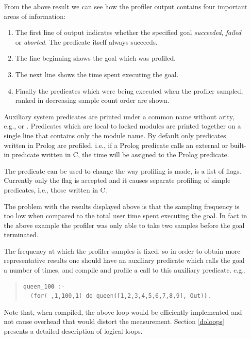 From the above result we can see how the profiler output contains four
important areas of information:
\begin{enumerate}
\item The first line of output indicates whether the specified goal
\emph{succeeded}, \emph{failed} or \emph{aborted}.  The
 predicate itself always succeeds.
\item The line beginning  shows the goal which was
profiled.
\item The next line shows the time spent executing the goal.
\item Finally the predicates which were being executed when the
profiler sampled, ranked in decreasing sample count order are shown.
\end{enumerate}

Auxiliary system predicates are printed under a
common name without arity, e.g.,  or
.
Predicates which are local to locked modules are printed
together on a single line that contains only the module name.
By default only predicates written in Prolog are profiled, i.e.,
if a Prolog predicate calls an external or built-in predicate
written in C, the time will be assigned to the Prolog predicate.

The predicate  can be used to change
the way profiling is made,  is a list of flags.
Currently only the flag  is accepted and it
causes separate profiling of simple predicates, i.e.,
those written in C.

The problem with the results displayed above is that the sampling
frequency is too low when compared to the total user time spent
executing the goal.  In fact in the above example the profiler was
only able to take two samples before the goal terminated.

The frequency at which the profiler samples is fixed, so in order to
obtain more representative results one should have an auxiliary
predicate which calls the goal a number of times, and compile and
profile a call to this auxiliary predicate. e.g.,

\begin{quote}
\begin{verbatim}
queen_100 :-
  (for(_,1,100,1) do queen([1,2,3,4,5,6,7,8,9],_Out)).
\end{verbatim}
\end{quote}

Note that, when compiled, the above  loop would be
efficiently implemented and not cause overhead that would distort the
measurement.  Section \ref{doloops} presents a
detailed description of logical loops.

